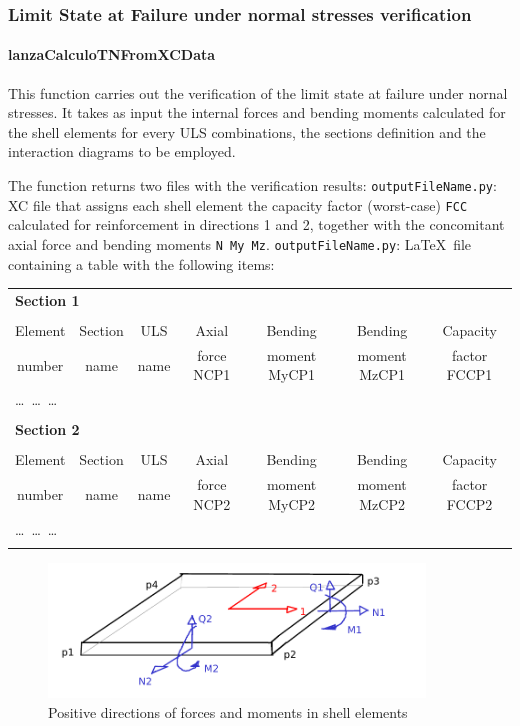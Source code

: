 \subsubsection{Limit State at Failure under normal stresses verification}

\paragraph{lanzaCalculoTNFromXCData}
This function carries out the verification of the limit state at failure under nornal stresses. It takes as input the internal forces and bending moments calculated for the shell elements for every ULS combinations, the sections definition and the interaction diagrams to be employed.

The function returns two files with the verification results:
{\tt outputFileName.py}: XC file that assigns each shell element the capacity factor (worst-case) {\tt FCC} calculated for reinforcement in directions 1 and 2, together with the concomitant axial force and bending moments {\tt N My Mz}.
{\tt outputFileName.py}: \LaTeX\  file containing a table with the following items:

\begin{center}
\begin{tabular}{ccccccc}
\multicolumn{7}{l}{\textbf{Section 1}} \\
\\
Element & Section & ULS & Axial & Bending & Bending & Capacity \\
number  & name & name & force NCP1 & moment MyCP1 & moment MzCP1 & factor FCCP1 \\
\hline
\multicolumn{7}{l}{\ldots\ \ldots\ \ldots} \\
\\
\multicolumn{7}{l}{\textbf{Section 2}} \\
\\
Element & Section & ULS & Axial & Bending & Bending & Capacity \\
number  & name & name & force NCP2 & moment MyCP2 & moment MzCP2 & factor FCCP2 \\
\hline
\multicolumn{7}{l}{\ldots\ \ldots\ \ldots} \\
\\

\end{tabular}
\end{center}

\begin{figure}[h]
\centering
\includegraphics[width=100mm]{materials/figures/signosEsfuerzos}
\caption{Positive directions of forces and moments in shell elements}\label{shell_forces_moments}
\end{figure}

